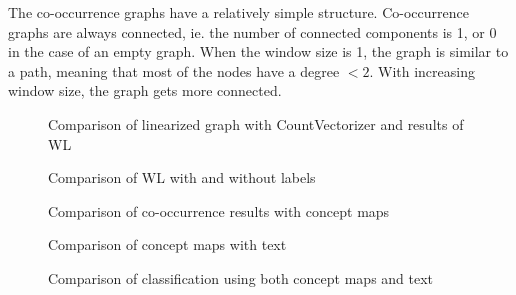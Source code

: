 The co-occurrence graphs have a relatively simple structure.
Co-occurrence graphs are always connected, ie. the number of connected components is 1, or 0 in the case of an empty graph.
When the window size is 1, the graph is similar to a path, meaning that most of the nodes have a degree $< 2$. With increasing window size, the graph gets more connected.


\begin{figure}[ht]
\centering
\missingfigure[figcolor=white]{}
\caption{Comparison of linearized graph with CountVectorizer and results of WL}
\end{figure}

\begin{figure}[ht]
\centering
\missingfigure[figcolor=white]{}
\caption{Comparison of WL with and without labels}
\end{figure}

\begin{figure}[ht]
\centering
\missingfigure[figcolor=white]{}
\caption{Comparison of co-occurrence results with concept maps}
\end{figure}

\begin{figure}[ht]
\centering
\missingfigure[figcolor=white]{}
\caption{Comparison of concept maps with text}
\end{figure}

\begin{figure}[ht]
\centering
\missingfigure[figcolor=white]{}
\caption{Comparison of classification using both concept maps and text}
\end{figure}



